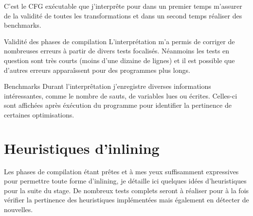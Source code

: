 \documentclass{beamer}
\begin{document}
C'est le CFG exécutable que j'interprête pour dans un premier temps m'assurer de la validité de toutes les transformations et dans un second temps réaliser des benchmarks.

\begin{frame}{Validité des phases de compilation}
    L'interprétation m'a permis de corriger de nombreuses erreurs à partir de divers tests focalisés. Néanmoins les tests en question sont très courts (moins d'une dizaine de lignes) et il est possible que d'autres erreurs apparaîssent pour des programmes plus longs.
\end{frame}

\begin{frame}{Benchmarks}
    Durant l'interprêtation j'enregistre diverses informations intéressantes, comme le nombre de sauts, de variables lues ou écrites. Celles-ci sont affichées après éxécution du programme pour identifier la pertinence de certaines optimisations.
\end{frame}



\section{Heuristiques d'inlining}

Les phases de compilation étant prêtes et à mes yeux suffisamment expressives pour permettre toute forme d'inlining, je détaille ici quelques idées d'heuristiques pour la suite du stage. De nombreux tests complets seront à réaliser pour à la fois vérifier la pertinence des heuristiques implémentées mais également en détecter de nouvelles.
\end{document}
